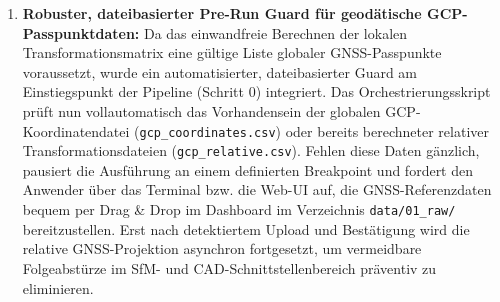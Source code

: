 \documentclass[12pt,a4paper]{article}
\begin{document}
\begin{enumerate}[noitemsep]
    \item \textbf{Robuster, dateibasierter Pre-Run Guard für geodätische GCP-Passpunktdaten:} Da das einwandfreie Berechnen der lokalen Transformationsmatrix eine gültige Liste globaler GNSS-Passpunkte voraussetzt, wurde ein automatisierter, dateibasierter Guard am Einstiegspunkt der Pipeline (Schritt 0) integriert. Das Orchestrierungsskript prüft nun vollautomatisch das Vorhandensein der globalen GCP-Koordinatendatei (\texttt{gcp\_coordinates.csv}) oder bereits berechneter relativer Transformationsdateien (\texttt{gcp\_relative.csv}). Fehlen diese Daten gänzlich, pausiert die Ausführung an einem definierten Breakpoint und fordert den Anwender über das Terminal bzw. die Web-UI auf, die GNSS-Referenzdaten bequem per Drag \& Drop im Dashboard im Verzeichnis \texttt{data/01\_raw/} bereitzustellen. Erst nach detektiertem Upload und Bestätigung wird die relative GNSS-Projektion asynchron fortgesetzt, um vermeidbare Folgeabstürze im SfM- und CAD-Schnittstellenbereich präventiv zu eliminieren.
\end{enumerate}
\end{document}
